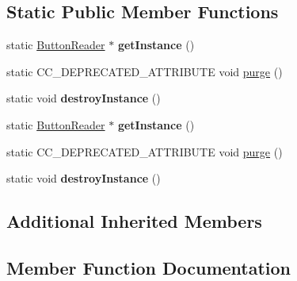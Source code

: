 \subsection*{Static Public Member Functions}
\begin{DoxyCompactItemize}
\item 
\mbox{\label{classcocostudio_1_1ButtonReader_aef62b6cc8167a98153d91543f66b5229}} 
static \hyperlink{classcocostudio_1_1ButtonReader}{Button\+Reader} $\ast$ {\bfseries get\+Instance} ()
\item 
static C\+C\+\_\+\+D\+E\+P\+R\+E\+C\+A\+T\+E\+D\+\_\+\+A\+T\+T\+R\+I\+B\+U\+TE void \hyperlink{classcocostudio_1_1ButtonReader_ad263a351006b614ac156ab4e26f9570a}{purge} ()
\item 
\mbox{\label{classcocostudio_1_1ButtonReader_ab5e7689376549a2ff2c0d4f923ae8adc}} 
static void {\bfseries destroy\+Instance} ()
\item 
\mbox{\label{classcocostudio_1_1ButtonReader_afd1a29e00541cdb71c6c73117fb7a1ec}} 
static \hyperlink{classcocostudio_1_1ButtonReader}{Button\+Reader} $\ast$ {\bfseries get\+Instance} ()
\item 
static C\+C\+\_\+\+D\+E\+P\+R\+E\+C\+A\+T\+E\+D\+\_\+\+A\+T\+T\+R\+I\+B\+U\+TE void \hyperlink{classcocostudio_1_1ButtonReader_a23617bd605be5fe875bacc1ca1704bc6}{purge} ()
\item 
\mbox{\label{classcocostudio_1_1ButtonReader_a295262c88e0fba42599a3475b3560b5f}} 
static void {\bfseries destroy\+Instance} ()
\end{DoxyCompactItemize}
\subsection*{Additional Inherited Members}


\subsection{Member Function Documentation}
\mbox{\label{classcocostudio_1_1ButtonReader_ad263a351006b614ac156ab4e26f9570a}} 
